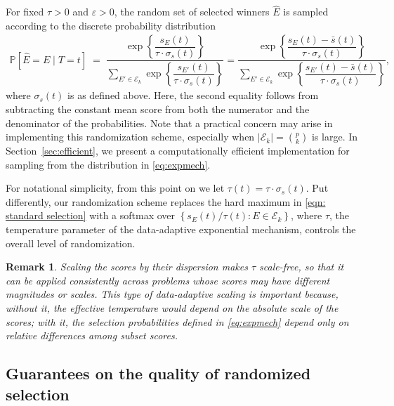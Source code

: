 \documentclass[12pt]{article}
\newcommand{\rbracket}[1]{\left[ #1 \right]}
\newtheorem{remark}{Remark}
\newcommand{\Pp}{{\mathbb{P}}}
\newcommand{\Ek}{\mathcal{E}_{k}}      %
\newcommand{\Ehat}{\widehat{E}}
\newcommand{\snoise}{\sigma_{s}}
\begin{document}
For fixed $\tau > 0$ and $\varepsilon > 0$, the random set of selected winners $\Ehat$ is sampled according to the discrete probability distribution
\begin{equation}
  \label{eq:expmech}
  \begin{aligned}
  \Pp\rbracket{\Ehat = E \;\Big|\; T=t}
    \;=\;
  \dfrac{\exp\!\left\{\dfrac{s_E(t)}{\tau \cdot \snoise (t)}\right\}}
       {\displaystyle\sum_{E' \in \Ek}
        \exp\!\left\{\dfrac{s_{E'}(t)}{\tau \cdot \snoise (t)}\right\}} = \dfrac{\exp\!\left\{\dfrac{s_E(t) - \bar{s}(t)}{\tau \cdot \snoise (t)}\right\}}
       {\displaystyle\sum_{E' \in \Ek}
        \exp\!\left\{\dfrac{s_{E'}(t)-\bar{s}(t)}{\tau \cdot \snoise (t)}\right\}},  
  \end{aligned}
\end{equation}
where $\snoise(t)$ is as defined above.
Here, the second equality follows from subtracting the constant mean score from both the numerator and the denominator of the probabilities. 
Note that a practical concern may arise in implementing this randomization scheme, especially when $|\Ek| = \binom{p}{k} $ is large. 
In Section~\ref{sec:efficient}, we present a computationally efficient implementation for sampling from the distribution in \eqref{eq:expmech}.

For notational simplicity, from this point on we let $\tau(t)= \tau \cdot \snoise (t)$.
Put differently, our randomization scheme replaces the hard maximum in \eqref{eqn: standard selection} with a softmax over $\left\{s_E(t)/\tau(t): E\in \Ek\right\}$, where $\tau$, the temperature parameter of the data-adaptive exponential mechanism, controls the overall level of randomization.

\begin{remark}
Scaling the scores by their dispersion makes $\tau$ scale-free, so that it can be applied consistently across problems whose scores may have different magnitudes or scales.
This type of data-adaptive scaling is important because, without it, the effective temperature would depend on the absolute scale of the scores; with it, the selection probabilities defined in \eqref{eq:expmech} depend only on relative differences among subset scores.
\end{remark}






\subsection{Guarantees on the quality of randomized selection}
\end{document}
